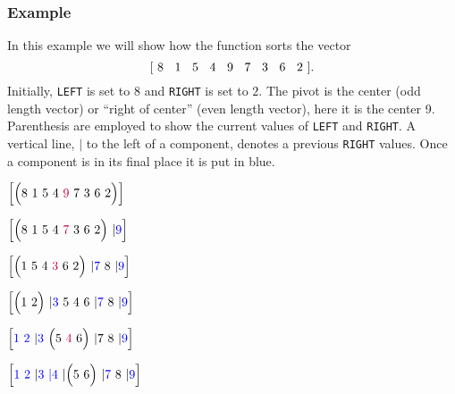 \documentclass[oneside,12pt]{book}
\begin{document}
\subsubsection*{Example}
In this example we will show how the function sorts the vector 
\[[ \ 8 \hspace{0.125in} 1 \hspace{0.125in} 5 \hspace{0.125in} 4 \hspace{0.125in} 9 \hspace{0.125in} 7 \hspace{0.125in} 3 \hspace{0.125in} 6 \hspace{0.125in} 2  \ ].\]  
Initially, \texttt{LEFT} is set to $8$ and \texttt{RIGHT} is set to $2$.  The {\color{purple}pivot} is the center (odd length vector) or ``right of center'' (even length vector), here it is the center 9.  Parenthesis are employed to show the current values of \texttt{LEFT} and \texttt{RIGHT}. A vertical line, $|$ to the left of a component, denotes a previous \texttt{RIGHT} values.  Once a component is in its final place it is put in {\color{blue} blue}.

\hspace*{\fill}
\begin{minipage}[t]{0.3\textwidth}
$\left[ \Big( 8 \ 1 \ 5 \ 4 \ {\color{purple}9} \ 7 \ 3 \ 6 \ 2  \Big) \right]$

\vspace*{0.125in}

$\left[ \Big( 8 \ 1 \ 5 \ 4  \ {\color{purple}7} \ 3 \ 6 \ 2  \Big)  \ | {\color{blue}9} \right]$

\vspace*{0.125in}

$\left[ \Big(  1 \ 5 \ 4 \ {\color{purple}3} \ 6 \ 2  \Big) \ | {\color{blue}7} \ 8  \ | {\color{blue}9} \right]$

\vspace*{0.125in}

$\left[ \Big(  1 \ 2 \Big) \ | {\color{blue}3} \ 5 \ 4 \ 6  \ | {\color{blue}7} \ 8  \ | {\color{blue}9} \right]$

\vspace*{0.125in}

$\left[ {\color{blue} 1 \ 2}  \ | {\color{blue}3} \ \Big(5 \ {\color{purple}4} \ 6\Big)  \ | 7 \ 8  \ | {\color{blue}9} \right]$

\vspace*{0.125in}

$\left[ {\color{blue} 1 \ 2}  \ | {\color{blue}3 \ |4} \ | \Big( 5 \ 6 \Big)  \ | {\color{blue}7} \ 8  \ | {\color{blue}9} \right]$
\end{minipage}
\hspace*{\fill}
\end{document}

